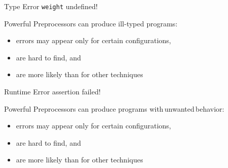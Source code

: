 \begin{frame}{\myframetitle}
	\begin{mycolumns}[T,animation=none,widths={73}]
	\mynextcolumn
		\begin{example}{Type Error}
			\texttt{weight} undefined!
		\end{example}

		\pause
		\begin{note}{Powerful Preprocessors}
			\setlength\leftmargini{3mm}
			can produce ill-typed programs:
			\begin{itemize}
				\item errors may appear only for certain configurations,
				\item are hard to find, and
				\item are more likely than for other techniques
			\end{itemize}
		\end{note}
	\end{mycolumns}
\end{frame}

\begin{frame}{\myframetitle}
	\begin{mycolumns}[T,animation=none,widths={73}]
	\mynextcolumn
		\begin{example}{Runtime Error}
			assertion failed!
		\end{example}

		\pause
		\begin{note}{Powerful Preprocessors}
			\setlength\leftmargini{3mm}
			can produce programs with\,unwanted\,behavior:
			\begin{itemize}
				\item errors may appear only for certain configurations,
				\item are hard to find, and
				\item are more likely than for other techniques
			\end{itemize}
		\end{note}
	\end{mycolumns}
\end{frame}


